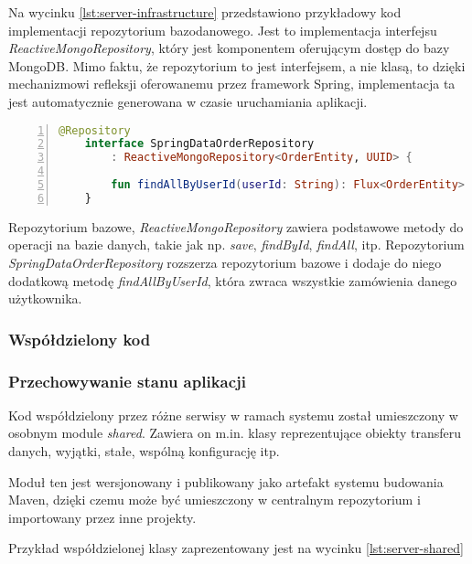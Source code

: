 Na wycinku \ref{lst:server-infrastructure} przedstawiono przykładowy kod implementacji repozytorium bazodanowego. Jest to implementacja interfejsu \textit{ReactiveMongoRepository}, który jest komponentem oferującym dostęp do bazy MongoDB. Mimo faktu, że repozytorium to jest interfejsem, a nie klasą, to dzięki mechanizmowi refleksji oferowanemu przez framework Spring, implementacja ta jest automatycznie generowana w czasie uruchamiania aplikacji.

\begin{lstlisting}[caption={Kod implementacji repozytorium bazodanowego},label={lst:server-infrastructure},captionpos=b,language=Kotlin,numbers=left,showstringspaces=false]
    @Repository
    interface SpringDataOrderRepository 
        : ReactiveMongoRepository<OrderEntity, UUID> {
    
        fun findAllByUserId(userId: String): Flux<OrderEntity>
    }
\end{lstlisting}

Repozytorium bazowe, \textit{ReactiveMongoRepository} zawiera podstawowe metody do operacji na bazie danych, takie jak np. \textit{save}, \textit{findById}, \textit{findAll}, itp. Repozytorium \textit{SpringDataOrderRepository} rozszerza repozytorium bazowe i dodaje do niego dodatkową metodę \textit{findAllByUserId}, która zwraca wszystkie zamówienia danego użytkownika.

\subsubsection{Współdzielony kod}\subsubsection{Przechowywanie stanu aplikacji}

Kod współdzielony przez różne serwisy w ramach systemu został umieszczony w osobnym module \textit{shared}. Zawiera on m.in. klasy reprezentujące obiekty transferu danych, wyjątki, stałe, wspólną konfigurację itp.

Moduł ten jest wersjonowany i publikowany jako artefakt systemu budowania Maven, dzięki czemu może być umieszczony w centralnym repozytorium i importowany przez inne projekty.

Przykład współdzielonej klasy zaprezentowany jest na wycinku \ref{lst:server-shared}

